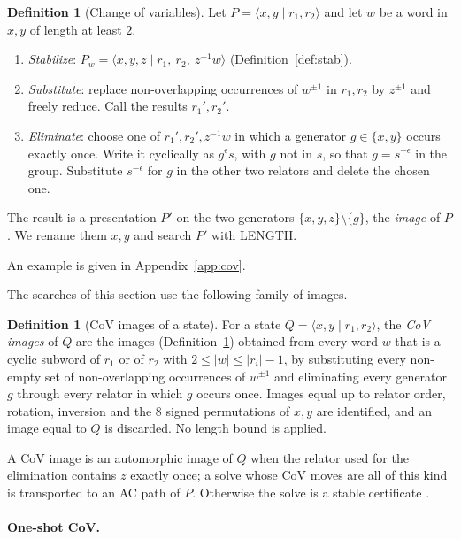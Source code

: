 \documentclass[11pt]{article}
\theoremstyle{definition}
\newtheorem{definition}[theorem]{Definition}
\theoremstyle{remark}
\newcommand{\pres}[2]{\langle #1 \mid #2 \rangle}
\begin{document}
\begin{definition}[Change of variables]\label{def:cov}
Let $P=\pres{x,y}{r_1,r_2}$ and let $w$ be a word in $x,y$ of length at least $2$.
\begin{enumerate}
  \item \emph{Stabilize}: $P_w=\pres{x,y,z}{r_1,\ r_2,\ z^{-1}w}$ (Definition~\ref{def:stab}).
  \item \emph{Substitute}: replace non-overlapping occurrences of $w^{\pm1}$ in $r_1,r_2$ by $z^{\pm1}$ and freely
  reduce. Call the results $r_1',r_2'$.
  \item \emph{Eliminate}: choose one of $r_1',r_2',z^{-1}w$ in which a generator $g\in\{x,y\}$ occurs exactly once.
  Write it cyclically as $g^{\epsilon}s$, with $g$ not in $s$, so that $g=s^{-\epsilon}$ in the group. Substitute
  $s^{-\epsilon}$ for $g$ in the other two relators and delete the chosen one.
\end{enumerate}
The result is a presentation $P'$ on the two generators $\{x,y,z\}\setminus\{g\}$, the \emph{image} of $P$. We rename
them $x,y$ and search $P'$ with LENGTH.
\end{definition}

An example is given in Appendix~\ref{app:cov}.

The searches of this section use the following family of images.

\begin{definition}[CoV images of a state]\label{def:covimages}
For a state $Q=\pres{x,y}{r_1,r_2}$, the \emph{CoV images} of $Q$ are the images (Definition~\ref{def:cov}) obtained
from every word $w$ that is a cyclic subword of $r_1$ or of $r_2$ with $2\le|w|\le|r_i|-1$, by substituting every
non-empty set of non-overlapping occurrences of $w^{\pm1}$ and eliminating every generator $g$ through every relator
in which $g$ occurs once. Images equal up to relator order, rotation, inversion and the $8$ signed permutations of
$x,y$ are identified, and an image equal to $Q$ is discarded. No length bound is applied.
\end{definition}

A CoV image is an automorphic image of $Q$ when the relator used for the elimination contains $z$ exactly once; a
solve whose CoV moves are all of this kind is transported to an AC path of $P$. Otherwise the solve is a stable
certificate \cite[Lemma~11]{SMM24}.

\paragraph{One-shot CoV.}
\end{document}
